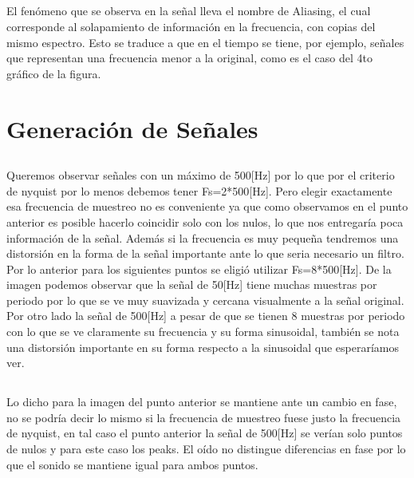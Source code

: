 \documentclass[11pt, letterpaper, titlepage]{article}
\begin{document}
\subsection{}
El fenómeno que se observa en la señal lleva el nombre de Aliasing, el cual corresponde al solapamiento de información en la frecuencia, con copias del mismo espectro. Esto se traduce a que en el tiempo se tiene, por ejemplo, señales que representan una frecuencia menor a la original, como es el caso del 4to gráfico de la figura.


\section{Generación de Señales}
\subsection{}
Queremos observar señales con un máximo de 500[Hz] por lo que por el criterio de nyquist por lo menos debemos tener Fs=2*500[Hz]. Pero elegir exactamente esa frecuencia de muestreo no es conveniente ya que como observamos en el punto anterior es posible hacerlo coincidir solo con los nulos, lo que nos entregaría poca información de la señal. Además si la frecuencia es muy pequeña tendremos una distorsión en la forma de la señal importante ante lo que seria necesario un filtro. Por lo anterior para los siguientes puntos se eligió utilizar Fs=8*500[Hz].
De la imagen podemos observar que la señal de 50[Hz] tiene muchas muestras por periodo por lo que se ve muy suavizada y cercana visualmente a la señal original. Por otro lado la señal de 500[Hz] a pesar de que se tienen 8 muestras por periodo con lo que se ve claramente su frecuencia y su forma sinusoidal, también se nota una distorsión importante en su forma respecto a la sinusoidal que esperaríamos ver.
\subsection{}
Lo dicho para la imagen del punto anterior se mantiene ante un cambio en fase, no se podría decir lo mismo si la frecuencia de muestreo fuese justo la frecuencia de nyquist, en tal caso el punto anterior la señal de 500[Hz] se verían solo puntos de nulos y para este caso los peaks. El oído no distingue diferencias en fase por lo que el sonido se mantiene igual para ambos puntos.
\end{document}
